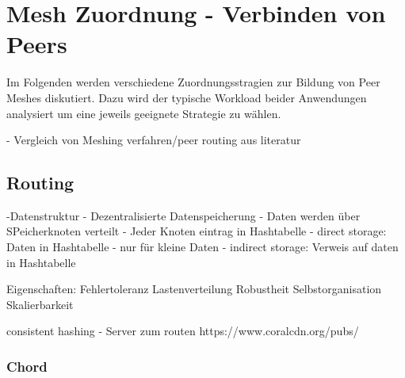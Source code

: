 %
%

\section{Mesh Zuordnung - Verbinden von Peers}
Im Folgenden werden verschiedene Zuordnungsstragien zur Bildung von Peer Meshes diskutiert. Dazu wird der typische Workload beider Anwendungen analysiert um eine jeweils geeignete Strategie zu wählen. 

- Vergleich von Meshing verfahren/peer routing aus literatur
\subsection{Routing}
-Datenstruktur
- Dezentralisierte Datenspeicherung
- Daten werden über SPeicherknoten verteilt
- Jeder Knoten eintrag in Hashtabelle
- direct storage: Daten in Hashtabelle
	- nur für kleine Daten
- indirect storage: Verweis auf daten in Hashtabelle

Eigenschaften:
Fehlertoleranz
Lastenverteilung
Robustheit
Selbstorganisation
Skalierbarkeit


consistent hashing
- Server zum routen
https://www.coralcdn.org/pubs/
\subsubsection{Chord}

